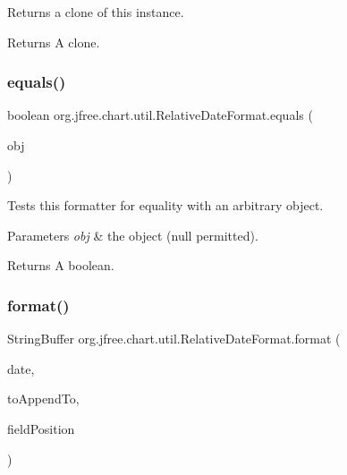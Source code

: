 Returns a clone of this instance.

\begin{DoxyReturn}{Returns}
A clone. 
\end{DoxyReturn}
\mbox{\label{classorg_1_1jfree_1_1chart_1_1util_1_1_relative_date_format_a36cc0286be133e34059869277068f58c}} 
\subsubsection{\texorpdfstring{equals()}{equals()}}
{\footnotesize\ttfamily boolean org.\+jfree.\+chart.\+util.\+Relative\+Date\+Format.\+equals (\begin{DoxyParamCaption}\item[{Object}]{obj }\end{DoxyParamCaption})}

Tests this formatter for equality with an arbitrary object.


\begin{DoxyParams}{Parameters}
{\em obj} & the object ({\ttfamily null} permitted).\\
\hline
\end{DoxyParams}
\begin{DoxyReturn}{Returns}
A boolean. 
\end{DoxyReturn}
\mbox{\label{classorg_1_1jfree_1_1chart_1_1util_1_1_relative_date_format_a4d52c2bd8c73f5e904e72205d6e46247}} 
\subsubsection{\texorpdfstring{format()}{format()}}
{\footnotesize\ttfamily String\+Buffer org.\+jfree.\+chart.\+util.\+Relative\+Date\+Format.\+format (\begin{DoxyParamCaption}\item[{Date}]{date,  }\item[{String\+Buffer}]{to\+Append\+To,  }\item[{Field\+Position}]{field\+Position }\end{DoxyParamCaption})}

